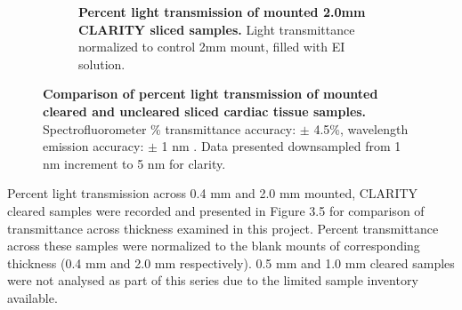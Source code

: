 \begin{figure}[H]
    \begin{subfigure}[t]{0.9\textwidth}
    \centering
    \caption{\textbf{Percent light transmission of mounted 2.0mm CLARITY sliced samples.} Light transmittance normalized to control 2mm mount, filled with EI solution.}    
    \label{fig:enter-label}
    \end{subfigure}
    \medskip
    
    \caption{\textbf{Comparison of percent light transmission of mounted cleared and uncleared sliced cardiac tissue samples.}  Spectrofluorometer \% transmittance accuracy: $\pm$ 4.5\%, wavelength emission accuracy: $\pm$ 1 nm \cite{noauthor_duetta_nodate}. Data presented downsampled from 1 nm increment to 5 nm for clarity.}    
    \label{fig:enter-label}
\end{figure}

Percent light transmission across 0.4 mm and 2.0 mm mounted, CLARITY cleared samples were recorded and presented in Figure 3.5 for comparison of transmittance across thickness examined in this project. Percent transmittance across these samples were normalized to the blank mounts of corresponding thickness (0.4 mm and 2.0 mm respectively). 0.5 mm and 1.0 mm cleared samples were not analysed as part of this series due to the limited sample inventory available. 


